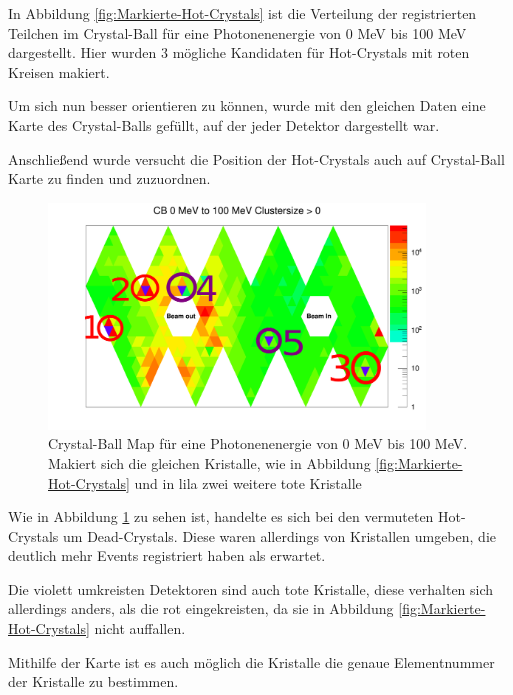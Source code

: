 \documentclass[a4paper,11pt,oneside,final,german,openbib,pdftex]{scrbook}
\begin{document}
{In Abbildung \ref{fig:Markierte-Hot-Crystals} ist die Verteilung der registrierten Teilchen im Crystal-Ball f\"ur eine Photonenenergie von 0 MeV bis 100 MeV dargestellt. Hier wurden 3 m\"ogliche Kandidaten f\"ur Hot-Crystals mit roten Kreisen makiert. 


Um sich nun besser orientieren zu k\"onnen, wurde mit den gleichen Daten eine Karte des Crystal-Balls gef\"ullt, auf der jeder Detektor dargestellt war.


Anschlie{\ss}end wurde versucht die Position der Hot-Crystals auch auf Crystal-Ball Karte zu finden und zuzuordnen.




\begin{figure}[h!]
	\begin{center}
		\includegraphics[width=100mm]{NewCalib/Strahlzeit2014/ClusterSizeNew/20172404Clustersize0Map100MeV}
		\caption[Strahlzeit: Symmetrische Photonen; Markierte Dead-Crystals auf der CB-Karte; Niedrige Energien]{Crystal-Ball Map f\"ur eine Photonenenergie von 0 MeV bis 100 MeV. Makiert sich die gleichen Kristalle, wie in Abbildung \ref{fig:Markierte-Hot-Crystals} und in lila zwei weitere tote Kristalle}
		\label{fig:Makierte-Kristalle-Map}
	\end{center}
\end{figure}

Wie in Abbildung \ref{fig:Makierte-Kristalle-Map} zu sehen ist, handelte es sich bei den vermuteten Hot-Crystals um Dead-Crystals. Diese waren allerdings von Kristallen umgeben, die deutlich mehr Events registriert haben als erwartet.

Die violett umkreisten Detektoren sind auch tote Kristalle, diese verhalten sich allerdings anders, als die rot eingekreisten, da sie in Abbildung \ref{fig:Markierte-Hot-Crystals} nicht auffallen.

Mithilfe der Karte ist es auch m\"oglich die Kristalle die genaue Elementnummer der Kristalle zu bestimmen.

}
\end{document}
